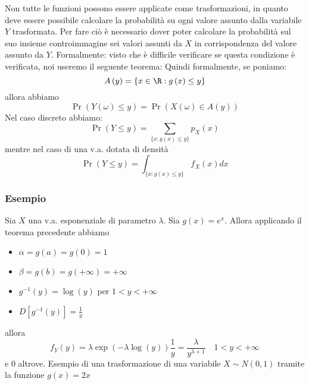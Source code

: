 Non tutte le funzioni possono essere applicate come trasformazioni, in quanto deve essere possibile calcolare la probabilità su ogni valore assunto dalla variabile $ Y $ trasformata. Per fare ciò è necessario dover poter calcolare la probabilità sul suo insieme controimmagine sei valori assunti da $ X $ in corrispondenza del valore assunto da $ Y $. Formalmente:
visto che è difficile verificare se questa condizione è verificata, noi useremo il seguente teorema:
\label{requisiti trasformazione}
Quindi formalmente, se poniamo:
\[
	A \left(y\right) = \left\{ x \in  \R : g\left(x\right) \le  y\right\}
\]
allora abbiamo
\[
	\Pr(Y(\omega) \leq y)=\Pr(X(\omega) \in A(y))
\]
Nel caso discreto abbiamo:
\[
	\Pr(Y \leq y)=\sum_{\{x: g(x) \leq y\}} p_X(x)
\]
mentre nel caso di una v.a. dotata di densità
\[
	\Pr(Y \leq y)=\int_{\{x: g(x) \leq y\}} f_X(x) d x
\]
\label{trasformazioni}
\subsubsection*{Esempio}
Sia $X$ una v.a. esponenziale di parametro $\lambda$. Sia $g(x)=e^x$. Allora applicando il teorema precedente abbiamo
\begin{itemize}
	\item $\alpha=g(a)=g(0)=1$
	\item $\beta=g(b)=g(+\infty)=+\infty$
	\item $g^{-1}(y)=\log (y)$ per $1<y<+\infty$
	\item $D \left[g^{-1}(y)\right]=\frac{1}{y}$
\end{itemize}
allora
\[
	f_Y(y)=\lambda \exp (-\lambda \log (y)) \frac{1}{y}=\frac{\lambda}{y^{\lambda+1}} \quad 1<y<+\infty
\]
e 0 altrove.
\vskip3mm
Esempio di una trasformazione di una variabile $ X \sim N\left(0,1\right) $ tramite la funzione $ g\left(x\right) = 2x $

